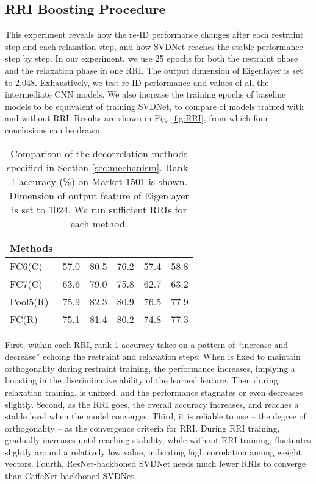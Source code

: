 \documentclass[10pt,twocolumn,letterpaper]{article}
\begin{document}
\subsection{RRI Boosting Procedure} \label{sec:RRI}
This experiment reveals how the re-ID performance changes after each restraint step and each relaxation step, and how SVDNet reaches the stable performance step by step. In our experiment, we use 25 epochs for both the restraint phase and the relaxation phase in one RRI. The output dimension of Eigenlayer is set to 2,048. Exhaustively, we test re-ID performance and  values of all the intermediate CNN models. We also increase the training epochs of baseline models to be equivalent of training SVDNet, to compare  of models trained with and without RRI. Results are shown in Fig. \ref{fig:RRI}, from which four conclusions can be drawn. 
\setlength{\tabcolsep}{8.3pt}
\begin{table}
\renewcommand\arraystretch{1.1}
\begin{center}
\begin{tabular}{l|ccccc}
\hline
Methods &&  &  &  &  \\
\hline
FC6(C) & 57.0 & 80.5 & 76.2 & 57.4 & 58.8\\
FC7(C) & 63.6 & 79.0 & 75.8 & 62.7 & 63.2\\
\hline
Pool5(R)&75.9 & 82.3 & 80.9 & 76.5 & 77.9\\
FC(R)   &75.1 & 81.4 &80.2  &74.8 & 77.3\\
\hline
\end{tabular}
\end{center}
\setlength{\abovecaptionskip}{0cm}
\caption{Comparison of the decorrelation methods specified in Section \ref{sec:mechanism}. Rank-1 accuracy (\%) on Market-1501 is shown. Dimension of output feature of Eigenlayer is set to 1024. We run sufficient RRIs for each method. }
\label{table:dec}
\end{table}

First, within each RRI, rank-1 accuracy takes on a pattern of ``increase and decrease'' echoing the restraint and relaxation steps: When  is fixed to maintain orthogonality during restraint training, the performance increases, implying a boosting in the discriminative ability of the learned feature. Then during relaxation training,  is unfixed, and the performance stagnates or even decreases slightly. Second, as the RRI goes, the overall accuracy increases, and reaches a stable level when the model converges. Third, it is reliable to use  -- the degree of orthogonality --  as the convergence criteria for RRI. During RRI training,  gradually increases until reaching stability, while without RRI training,  fluctuates slightly around a relatively low value, indicating high correlation among weight vectors. Fourth, ResNet-backboned SVDNet needs much fewer RRIs to converge than CaffeNet-backboned SVDNet. 
\end{document}
